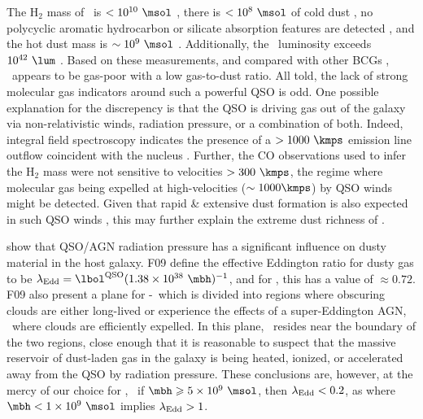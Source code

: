\documentclass[useAMS,usenatbib]{mn2e}
\begin{document}
The H$_2$ mass of \irs\ is $< 10^{10} ~\msol$
\citep{1998ApJ...506..205E}, there is $< 10^8 ~\msol$ of cold dust
\citep{2001MNRAS.326.1467D}, no polycyclic aromatic hydrocarbon or
silicate absorption features are detected \citep{2004ApJ...613..986P,
  2008ApJ...683..114S}, and the hot dust mass is $\sim 10^9 ~\msol$
\citep{1997A&A...318L...1T}. Additionally, the \halpha\ luminosity
exceeds $10^{42} ~\lum$ \citep{1996MNRAS.283.1003C,
  1998ApJ...506..205E}. Based on these measurements, and compared with
other BCGs \citep[\eg][]{2001MNRAS.328..762E}, \irs\ appears to be
gas-poor with a low gas-to-dust ratio. All told, the lack of strong
molecular gas indicators around such a powerful QSO is odd. One
possible explanation for the discrepency is that the QSO is driving
gas out of the galaxy via non-relativistic winds, radiation pressure,
or a combination of both. Indeed, integral field spectroscopy
indicates the presence of a $> 1000 ~\kmps$ emission line outflow
coincident with the nucleus \citep{1996MNRAS.283.1003C}. Further, the
CO observations used to infer the H$_2$ mass
\citep{1998ApJ...506..205E} were not sensitive to velocities $> 300
~\kmps$, the regime where molecular gas being expelled at
high-velocities ($\sim 1000 \kmps$) by QSO winds might be detected.
Given that rapid \& extensive dust formation is also expected in such
QSO winds \citep{2002ApJ...567L.107E}, this may further explain the
extreme dust richness of \irs.

\citet[][hereafter F09]{2009MNRAS.394L..89F} show that QSO/AGN
radiation pressure has a significant influence on dusty material in
the host galaxy. F09 define the effective Eddington ratio for dusty
gas to be $\leff = \lqso (1.38 \times 10^{38} ~\mbh)^{-1}$, and for
\irs, this has a value of $\approx 0.72$. F09 also present a plane for
\nhobs-\leff\ which is divided into regions where obscuring clouds are
either long-lived or experience the effects of a super-Eddington AGN,
\ie\ where clouds are efficiently expelled. In this plane,
\irs\ resides near the boundary of the two regions, close enough that
it is reasonable to suspect that the massive reservoir of dust-laden
gas in the galaxy is being heated, ionized, or accelerated away from
the QSO by radiation pressure. These conclusions are, however, at the
mercy of our choice for \mbh, \ie\ if $\mbh \ge 5 \times 10^9 ~\msol$,
then $\lambda_{\mathrm{Edd}} < 0.2$, as where $\mbh < 1 \times 10^9 ~\msol$ implies
$\lambda_{\mathrm{Edd}} > 1$.
\end{document}
